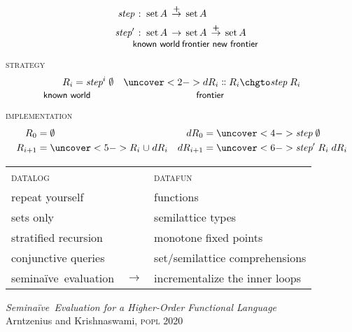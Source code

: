 \documentclass[aspectratio=141,dvipsnames]{beamer}
\newcommand\isa{\hspace{.1em}:\hspace{.1em}}
\newcommand\n\textit
\newcommand\tpname\text
\newcommand\tset{\tpname{set}\,}
\newcommand\mto{\overset{\boldsymbol+}{\to}}
\newcommand\naive{na\"ive}
\let\oldcup\cup
\renewcommand\cup{\mathrel{\oldcup}}
\begin{document}

  \begin{frame}
      \begin{align*}
        \n{step} &\isa \,\tset A\, \mto \,\tset A\,
        \\
        \n{step}' &\isa
        \underexplain{}{2cm}{known world}{\,\tset A\,}
        \to \underexplain{}{1.8cm}{frontier}{\,\tset A\,}
        \mto \underexplain{}{1.8cm}{new frontier}{\,\tset A\,}
      \end{align*}

      \textsc{strategy}
      \begin{align*}
        \underexplain{}{2cm}{known world}{{R_i}} &= \n{step}^i\;\emptyset
        &\uncover<2->{\chg{\underexplain{}{1.5cm}{frontier}{{dR_i}}}{R_i}{\n{step}\;R_i}}
      \end{align*}
      \pause\pause

      \textsc{implementation}
      \begin{align*}
        R_0 &= \emptyset %
        & dR_0 &= \uncover<4->{\n{step}\;\emptyset} %
        \\
        R_{i+1} &= \uncover<5->{R_i \cup dR_i} %
        & dR_{i+1} &= \uncover<6->{\n{step}' \;R_i \;dR_i}
      \end{align*}
      \vspace{\baselineskip}
  \end{frame}


  \begin{frame}

    \begin{center}
      \begin{tabular}{@{}lcl@{}}
        \scshape\color{Blue} datalog && \scshape\color{Blue} datafun
        \\[.5ex]
        \color{gray} repeat yourself &&
        \color{gray} functions
        \\
        \color{gray} sets only &&
        \color{gray} semilattice types
        \\
        \color{gray} stratified recursion
        && \color{gray} monotone fixed points
        \\
        \color{gray} conjunctive queries
        && \color{gray} set/semilattice comprehensions
        \\
        semi\naive\ evaluation
        & $\to$
        & incrementalize the inner loops
      \end{tabular}
    \end{center}
    \vspace{2ex}

    {\small 
    \emph{Semi\naive\ Evaluation for a Higher-Order Functional
      Language}\\
         {Arntzenius and Krishnaswami}, \scshape popl 2020 \par}
    
  \end{frame}
\end{document}

